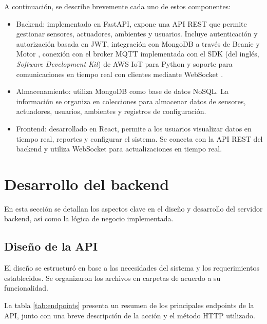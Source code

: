 A continuación, se describe brevemente cada uno de estos componentes:

\begin{itemize}
    \item Backend: implementado en FastAPI, expone una API REST que permite gestionar
          sensores, actuadores, ambientes y usuarios. Incluye autenticación y
          autorización basada en JWT, integración con MongoDB a través de Beanie
          \cite{BeaniODM} y Motor \cite{MotorMongoDB}, conexión con el broker MQTT
          implementada con el SDK (del inglés, \textit{Software Development Kit}) de AWS
          IoT para Python \cite{AWSIoTSDK} y soporte para comunicaciones en tiempo real
          con clientes mediante WebSocket \cite{FastAPIWebSockets}.

    \item Almacenamiento: utiliza MongoDB como base de datos NoSQL. La información se
          organiza en colecciones para almacenar datos de sensores, actuadores, usuarios,
          ambientes y registros de configuración.

    \item Frontend: desarrollado en React, permite a los usuarios visualizar datos en
          tiempo real, reportes y configurar el sistema. Se conecta con la API REST del
          backend y utiliza WebSocket para actualizaciones en tiempo real.
\end{itemize}

\section{Desarrollo del backend}

En esta sección se detallan los aspectos clave en el diseño y desarrollo del
servidor backend, así como la lógica de negocio implementada.

\subsection{Diseño de la API}

El diseño se estructuró en base a las necesidades del sistema y los
requerimientos establecidos. Se organizaron los archivos en carpetas de acuerdo
a su funcionalidad.

La tabla \ref{tab:endpoints} presenta un resumen de los principales endpoints
de la API, junto con una breve descripción de la acción y el método HTTP
utilizado.

